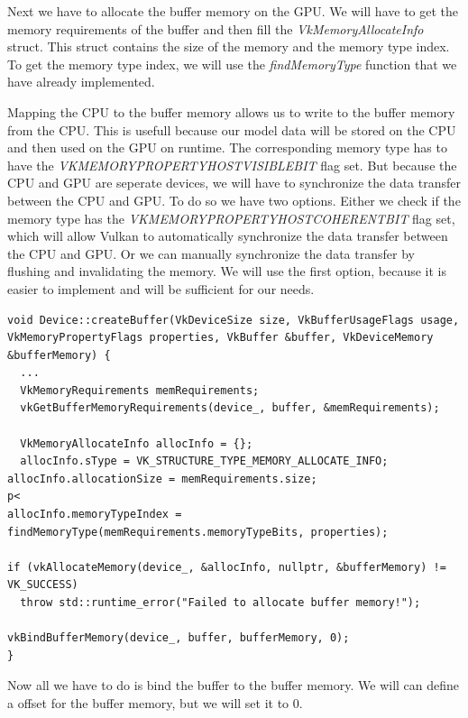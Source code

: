 \documentclass[12pt]{report} \usepackage{preamble}
\begin{document}
Next we have to allocate the buffer memory on the GPU. We will have to get the memory requirements of the buffer and then fill the \textit{VkMemoryAllocateInfo} struct.
This struct contains the size of the memory and the memory type index. To get the memory type index, we will use the \textit{findMemoryType} function that we have already
implemented.

Mapping the CPU to the buffer memory allows us to write to the buffer memory from the CPU. This is usefull because
our model data will be stored on the CPU and then used on the GPU on runtime. The corresponding memory type has to have the
\textit{VK\textunderscore MEMORY\textunderscore PROPERTY\textunderscore HOST\textunderscore VISIBLE\textunderscore BIT} flag set.
But because the CPU and GPU are seperate devices, we will have to synchronize the data transfer between the CPU and GPU.
To do so we have two options. Either we check if the memory type has the \textit{VK\textunderscore MEMORY\textunderscore PROPERTY\textunderscore HOST\textunderscore COHERENT\textunderscore BIT} flag set,
which will allow Vulkan to automatically synchronize the data transfer between the CPU and GPU. Or we can manually synchronize the data transfer by flushing and invalidating the memory.
We will use the first option, because it is easier to implement and will be sufficient for our needs.

\begin{lstlisting}[Language=C++]
void Device::createBuffer(VkDeviceSize size, VkBufferUsageFlags usage, VkMemoryPropertyFlags properties, VkBuffer &buffer, VkDeviceMemory &bufferMemory) {
  ...
  VkMemoryRequirements memRequirements;
  vkGetBufferMemoryRequirements(device_, buffer, &memRequirements);

  VkMemoryAllocateInfo allocInfo = {};
  allocInfo.sType = VK_STRUCTURE_TYPE_MEMORY_ALLOCATE_INFO;
allocInfo.allocationSize = memRequirements.size;
p<
allocInfo.memoryTypeIndex = findMemoryType(memRequirements.memoryTypeBits, properties);

if (vkAllocateMemory(device_, &allocInfo, nullptr, &bufferMemory) != VK_SUCCESS)
  throw std::runtime_error("Failed to allocate buffer memory!");

vkBindBufferMemory(device_, buffer, bufferMemory, 0);
}
\end{lstlisting}

Now all we have to do is bind the buffer to the buffer memory. We will can define a offset for the buffer memory, but we will set it to 0.
\end{document}

